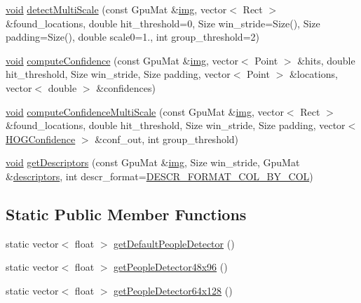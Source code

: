\begin{DoxyCompactItemize}
\item 
\hyperlink{legacy_8hpp_a8bb47f092d473522721002c86c13b94e}{void} \hyperlink{structcv_1_1gpu_1_1HOGDescriptor_a528af2707b591a1bd7b32358c4773d03}{detect\-Multi\-Scale} (const Gpu\-Mat \&\hyperlink{legacy_8hpp_a5349238b3772bed6eae0fda3117ccfef}{img}, vector$<$ Rect $>$ \&found\-\_\-locations, double hit\-\_\-threshold=0, Size win\-\_\-stride=Size(), Size padding=Size(), double scale0=1., int group\-\_\-threshold=2)
\item 
\hyperlink{legacy_8hpp_a8bb47f092d473522721002c86c13b94e}{void} \hyperlink{structcv_1_1gpu_1_1HOGDescriptor_a4ed8b4687f01ee15a1099d7d85d92419}{compute\-Confidence} (const Gpu\-Mat \&\hyperlink{legacy_8hpp_a5349238b3772bed6eae0fda3117ccfef}{img}, vector$<$ Point $>$ \&hits, double hit\-\_\-threshold, Size win\-\_\-stride, Size padding, vector$<$ Point $>$ \&locations, vector$<$ double $>$ \&confidences)
\item 
\hyperlink{legacy_8hpp_a8bb47f092d473522721002c86c13b94e}{void} \hyperlink{structcv_1_1gpu_1_1HOGDescriptor_a2ecad1e6e00aa0ccde80c67f2d6f4aa6}{compute\-Confidence\-Multi\-Scale} (const Gpu\-Mat \&\hyperlink{legacy_8hpp_a5349238b3772bed6eae0fda3117ccfef}{img}, vector$<$ Rect $>$ \&found\-\_\-locations, double hit\-\_\-threshold, Size win\-\_\-stride, Size padding, vector$<$ \hyperlink{structcv_1_1gpu_1_1HOGConfidence}{H\-O\-G\-Confidence} $>$ \&conf\-\_\-out, int group\-\_\-threshold)
\item 
\hyperlink{legacy_8hpp_a8bb47f092d473522721002c86c13b94e}{void} \hyperlink{structcv_1_1gpu_1_1HOGDescriptor_a1612ce43c80c7b8723ff3979bd602cd9}{get\-Descriptors} (const Gpu\-Mat \&\hyperlink{legacy_8hpp_a5349238b3772bed6eae0fda3117ccfef}{img}, Size win\-\_\-stride, Gpu\-Mat \&\hyperlink{compat_8hpp_a1e3702ddbca6258f57508c22eff26bf2}{descriptors}, int descr\-\_\-format=\hyperlink{structcv_1_1gpu_1_1HOGDescriptor_aec73725a02c7ce1aff7a0587391abecaaf310a595ef7d638c2d05f405dc55817b}{D\-E\-S\-C\-R\-\_\-\-F\-O\-R\-M\-A\-T\-\_\-\-C\-O\-L\-\_\-\-B\-Y\-\_\-\-C\-O\-L})
\end{DoxyCompactItemize}
\subsection*{Static Public Member Functions}
\begin{DoxyCompactItemize}
\item 
static vector$<$ float $>$ \hyperlink{structcv_1_1gpu_1_1HOGDescriptor_a251b35c2abb97413ee966d9d60ca0e47}{get\-Default\-People\-Detector} ()
\item 
static vector$<$ float $>$ \hyperlink{structcv_1_1gpu_1_1HOGDescriptor_a578d6ca0b50c5527cee6cdf5fc47c8b3}{get\-People\-Detector48x96} ()
\item 
static vector$<$ float $>$ \hyperlink{structcv_1_1gpu_1_1HOGDescriptor_a360ce2c70dc83c0d52cfdaddfab52926}{get\-People\-Detector64x128} ()
\end{DoxyCompactItemize}

